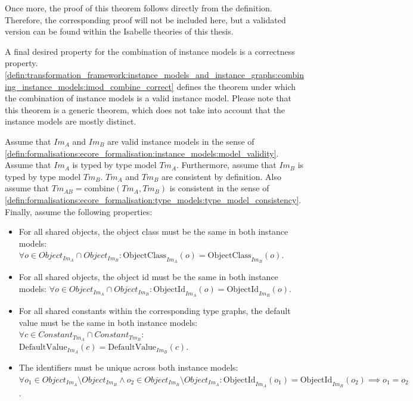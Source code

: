 Once more, the proof of this theorem follows directly from the definition. Therefore, the corresponding proof will not be included here, but a validated version can be found within the Isabelle theories of this thesis.

A final desired property for the combination of instance models is a correctness property. \cref{defin:transformation_framework:instance_models_and_instance_graphs:combining_instance_models:imod_combine_correct} defines the theorem under which the combination of instance models is a valid instance model. Please note that this theorem is a generic theorem, which does not take into account that the instance models are mostly distinct.

\begin{thm}
\label{defin:transformation_framework:instance_models_and_instance_graphs:combining_instance_models:imod_combine_correct}
Assume that $Im_A$ and $Im_B$ are valid instance models in the sense of \cref{defin:formalisations:ecore_formalisation:instance_models:model_validity}. Assume that $Im_A$ is typed by type model $Tm_A$. Furthermore, assume that $Im_B$ is typed by type model $Tm_B$. $Tm_A$ and $Tm_B$ are consistent by definition. Also assume that $Tm_{AB} = \mathrm{combine}(Tm_A, Tm_B)$ is consistent in the sense of \cref{defin:formalisations:ecore_formalisation:type_models:type_model_consistency}. Finally, assume the following properties:
\begin{itemize}
    \item For all shared objects, the object class must be the same in both instance models: $\forall o \in Object_{Im_A} \cap Object_{Im_B}\!: \mathrm{ObjectClass}_{Im_A}(o) = \mathrm{ObjectClass}_{Im_B}(o)$.
    \item For all shared objects, the object id must be the same in both instance models: $\forall o \in Object_{Im_A} \cap Object_{Im_B}\!: \mathrm{ObjectId}_{Im_A}(o) = \mathrm{ObjectId}_{Im_B}(o)$.
    \item For all shared constants within the corresponding type graphs, the default value must be the same in both instance models: $\forall c \in Constant_{Tm_A} \cap Constant_{Tm_B}\!:$\\$\mathrm{DefaultValue}_{Im_A}(c) = \mathrm{DefaultValue}_{Im_B}(c)$.
    \item The identifiers must be unique across both instance models: $\forall o_1 \in Object_{Im_A} \setminus Object_{Im_B} \land o_2 \in Object_{Im_B} \setminus Object_{Im_A}\!: \mathrm{ObjectId}_{Im_A}(o_1) = \mathrm{ObjectId}_{Im_B}(o_2) \implies o_1 = o_2$.

\end{itemize}
\end{thm}
